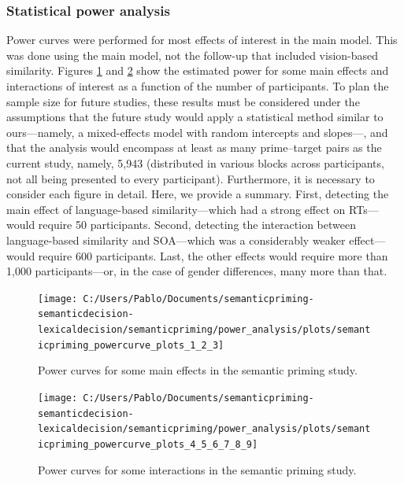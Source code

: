 \documentclass[
  12pt,
  man,floatsintext]{apa7}
\begin{document}
\hypertarget{statistical-power-analysis-2}{%
\subsubsection{Statistical power analysis}\label{statistical-power-analysis-2}}

Power curves were performed for most effects of interest in the main model. This was done using the main model, not the follow-up that included vision-based similarity. Figures \ref{fig:semanticpriming-powercurve-plots-1-2-3} and \ref{fig:semanticpriming-powercurve-plots-4-5-6-7-8-9} show the estimated power for some main effects and interactions of interest as a function of the number of participants. To plan the sample size for future studies, these results must be considered under the assumptions that the future study would apply a statistical method similar to ours---namely, a mixed-effects model with random intercepts and slopes---, and that the analysis would encompass at least as many prime--target pairs as the current study, namely, 5,943 (distributed in various blocks across participants, not all being presented to every participant). Furthermore, it is necessary to consider each figure in detail. Here, we provide a summary. First, detecting the main effect of language-based similarity---which had a strong effect on RTs---would require 50 participants. Second, detecting the interaction between language-based similarity and SOA---which was a considerably weaker effect---would require 600 participants. Last, the other effects would require more than 1,000 participants---or, in the case of gender differences, many more than that.

\begin{figure}

{\centering \texttt{[image: C:/Users/Pablo/Documents/semanticpriming-semanticdecision-lexicaldecision/semanticpriming/power\_analysis/plots/semanticpriming\_powercurve\_plots\_1\_2\_3]} 

}

\caption{Power curves for some main effects in the semantic priming study.}\label{fig:semanticpriming-powercurve-plots-1-2-3}
\end{figure}

\begin{figure}

{\centering \texttt{[image: C:/Users/Pablo/Documents/semanticpriming-semanticdecision-lexicaldecision/semanticpriming/power\_analysis/plots/semanticpriming\_powercurve\_plots\_4\_5\_6\_7\_8\_9]} 

}

\caption{Power curves for some interactions in the semantic priming study.}\label{fig:semanticpriming-powercurve-plots-4-5-6-7-8-9}
\end{figure}
\end{document}
